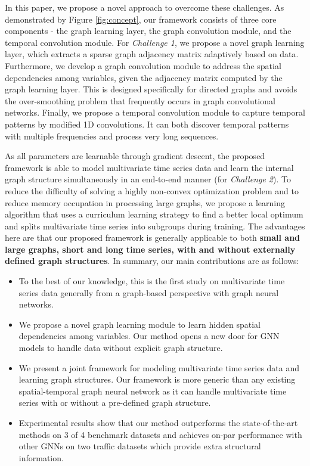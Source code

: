 \documentclass[sigconf]{acmart}
\begin{document}
In this paper, we propose a novel approach to overcome these challenges. As demonstrated by Figure \ref{fig:concept}, our framework consists of three core components - the graph learning layer, the graph convolution module, and the temporal convolution module. For \textit{Challenge 1}, we propose a novel graph learning layer, which extracts a sparse graph adjacency matrix adaptively based on data. Furthermore, we develop a graph convolution module to address the spatial dependencies among variables, given the adjacency matrix computed by the graph learning layer. This is designed specifically for directed graphs and avoids the over-smoothing problem that frequently occurs in graph convolutional networks. Finally, we propose a temporal convolution module to capture temporal patterns by modified 1D convolutions. It can both discover temporal patterns with multiple frequencies and process very long sequences.

As all parameters are learnable through gradient descent, the proposed framework is able to model multivariate time series data and learn the internal graph structure simultaneously in an end-to-end manner (for \textit{Challenge 2}). To reduce the difficulty of solving a highly non-convex optimization problem and to reduce memory occupation in processing large graphs, we propose a learning algorithm that uses a curriculum learning strategy to find a better local optimum and splits multivariate time series into subgroups during training. The advantages here are that our proposed framework is generally applicable to both \textbf{small and large graphs, short and long time series, with and without externally defined graph structures}. In summary, our main contributions are as follows:

\begin{itemize}
    \item To the best of our knowledge, this is the first study on multivariate time series data generally from a graph-based perspective with graph neural networks.
    
    \item We propose a novel graph learning module to learn hidden spatial dependencies among variables. Our method opens a new door for GNN models to handle data without explicit graph structure. 

    \item We present a joint framework for modeling multivariate time series data and learning graph structures. Our framework is more generic than any existing spatial-temporal graph neural network as it can handle multivariate time series with or without a pre-defined graph structure.
    
    \item Experimental results show that our method outperforms the state-of-the-art  methods on 3 of 4 benchmark datasets and achieves on-par performance with other GNNs on two traffic datasets which provide extra structural information.
\end{itemize}
\end{document}
